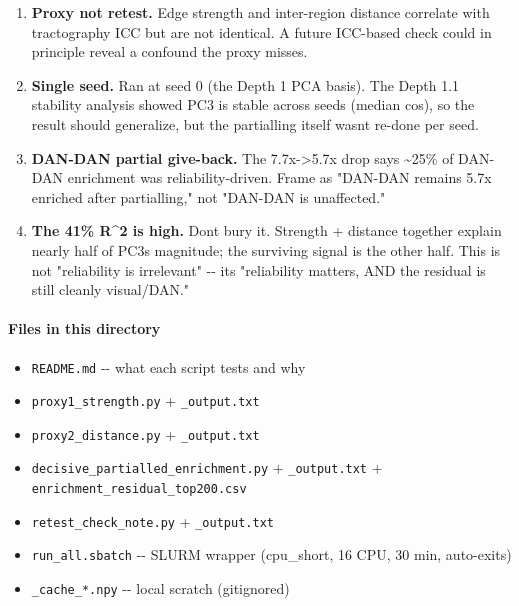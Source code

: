 \begin{enumerate}
\def\labelenumi{\arabic{enumi}.}
\tightlist
\item
  \textbf{Proxy not retest.} Edge strength and inter-region distance correlate with tractography ICC but are not identical. A future ICC-based check could in principle reveal a confound the proxy misses.
\item
  \textbf{Single seed.} Ran at seed 0 (the Depth 1 PCA basis). The Depth 1.1 stability analysis showed PC3 is stable across seeds (median \textbar cos), so the result should generalize, but the partialling itself wasn\textquotesingle t re-done per seed.
\item
  \textbf{DAN-DAN partial give-back.} The 7.7x-\textgreater5.7x drop says \textasciitilde25\% of DAN-DAN enrichment was reliability-driven. Frame as "DAN-DAN remains 5.7x enriched after partialling," not "DAN-DAN is unaffected."
\item
  \textbf{The 41\% R\^{}2 is high.} Don\textquotesingle t bury it. Strength + distance together explain nearly half of \textbar PC3\textbar\textquotesingle s magnitude; the surviving signal is the other half. This is not "reliability is irrelevant" -\/- it\textquotesingle s "reliability matters, AND the residual is still cleanly visual/DAN."
\end{enumerate}

\paragraph{Files in this directory}\label{files-in-this-directory}

\begin{itemize}
\tightlist
\item
  \texttt{README.md} -\/- what each script tests and why
\item
  \texttt{proxy1\_strength.py} + \texttt{\_output.txt}
\item
  \texttt{proxy2\_distance.py} + \texttt{\_output.txt}
\item
  \texttt{decisive\_partialled\_enrichment.py} + \texttt{\_output.txt} + \texttt{enrichment\_residual\_top200.csv}
\item
  \texttt{retest\_check\_note.py} + \texttt{\_output.txt}
\item
  \texttt{run\_all.sbatch} -\/- SLURM wrapper (cpu\_short, 16 CPU, 30 min, auto-exits)
\item
  \texttt{\_cache\_*.npy} -\/- local scratch (gitignored)
\end{itemize}

